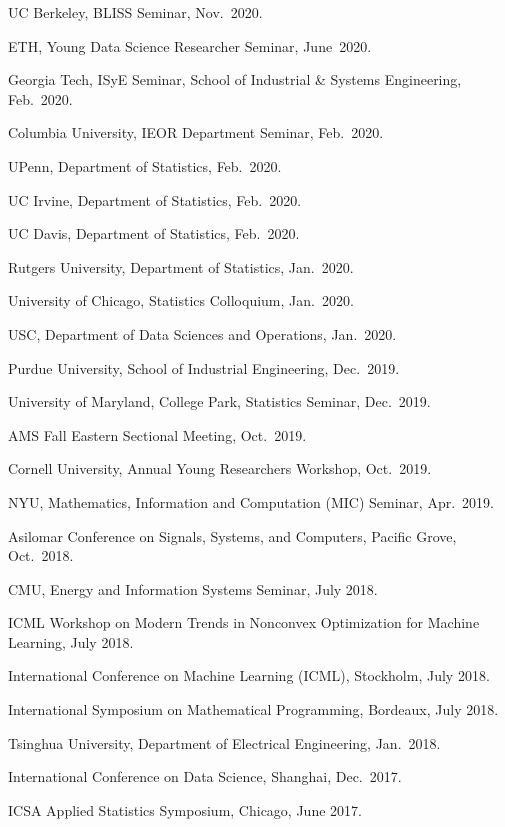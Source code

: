 \documentclass[a4paper, 10pt]{article}
\newenvironment{changemargin}[2]{%
  \begin{list}{}{%
    \setlength{\topsep}{0pt}%
    \setlength{\leftmargin}{#1}%
    \setlength{\rightmargin}{#2}%
    \setlength{\listparindent}{\parindent}%
    \setlength{\itemindent}{\parindent}%
    \setlength{\parsep}{\parskip}%
  }%
  \item[]}{\end{list}
}
\newenvironment{body} {
	\vspace*{-16pt}
	\begin{changemargin}{-0.3in}{-0.5in}
  }	
	{\end{changemargin}
}
\begin{document}
\begin{body}
\begin{enumerate}[label={[{T}{{\arabic*}}]}]
	\item UC Berkeley, BLISS Seminar, Nov.~2020.
	\item ETH, Young Data Science Researcher Seminar, June~2020.
	\item Georgia Tech, ISyE Seminar, School of Industrial \& Systems Engineering, Feb.~2020.
	\item Columbia University, IEOR Department Seminar, Feb.~2020.
	\item UPenn, Department of Statistics, Feb.~2020.
	\item UC Irvine, Department of Statistics, Feb.~2020.
	\item UC Davis, Department of Statistics, Feb.~2020.
	\item Rutgers University, Department of Statistics, Jan.~2020.
	\item University of Chicago, Statistics Colloquium, Jan.~2020.
	\item USC, Department of Data Sciences and Operations, Jan.~2020.
	\item Purdue University, School of Industrial Engineering, Dec.~2019.
	\item University of Maryland, College Park, Statistics Seminar, Dec.~2019.
	\item AMS Fall Eastern Sectional Meeting, Oct.~2019.
	\item Cornell University, Annual Young Researchers Workshop, Oct.~2019.
	\item NYU, Mathematics, Information and Computation (MIC) Seminar, Apr.~2019.
		\item Asilomar Conference on Signals, Systems, and Computers, Pacific Grove, Oct.~2018.
		\item CMU, Energy and Information Systems Seminar, July 2018.
		\item ICML Workshop on Modern Trends in Nonconvex Optimization for Machine Learning, July 2018.
		\item International Conference on Machine Learning (ICML), Stockholm, July 2018.
		\item International Symposium on Mathematical Programming, Bordeaux, July 2018.
		\item Tsinghua University, Department of Electrical Engineering, Jan.~2018.
			
		\item International Conference on Data Science, Shanghai, Dec.~2017.
		\item ICSA Applied Statistics Symposium, Chicago, June 2017.
		
		\end{enumerate}
\end{body}
\end{document}
